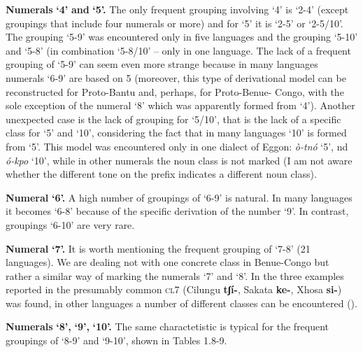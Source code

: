 \textbf{Numerals} \textbf{‘4’} \textbf{and} \textbf{‘5’.} The only frequent grouping involving ‘4’ is ‘2-4’ (except groupings that include four numerals or more) and for ‘5’ it is ‘2-5’ or ‘2-5/10’. The grouping ‘5-9’ was encountered only in five languages and the grouping ‘5-10’ and ‘5-8’ (in combination ‘5-8/10’ – only in one language. The lack of a frequent grouping of ‘5-9’ can seem even more strange because in many languages numerals ‘6-9’ are based on 5 (moreover, this type of derivational model can be reconstructed for Proto-Bantu and, perhaps, for Proto-Benue- Congo, with the sole exception of the numeral ‘8’ which was apparently formed from ‘4’). Another unexpected case is the lack of grouping for ‘5/10’, that is the lack of a specific class for ‘5’ and ‘10’, considering the fact that in many languages ‘10’ is formed from ‘5’. This model was encountered only in one dialect of Eggon: \textit{{\`{o}}-tn{\'{o}}} ‘5’, nd \textit{{\'{o}}-kpo} ‘10’, while in other numerals the noun class is not marked (I am not aware whether the different tone on the prefix indicates a different noun class). 

\textbf{Numeral} \textbf{‘6’.} A high number of groupings of ‘6-9’ is natural. In many languages it becomes ‘6-8’ because of the specific derivation of the number ‘9’. In contrast, groupings ‘6-10’ are very rare. 

\textbf{Numeral} \textbf{‘7’.} It is worth mentioning the frequent grouping of ‘7-8’ (21 languages). We are dealing not with one concrete class in Benue-Congo but rather a similar way of marking the numerals ‘7’ and ‘8’. In the three examples reported in  the presumably common \textsc{cl}7 (Cilungu \textbf{tʃ{\'{i}}-}, Sakata \textbf{ke-}, Xhosa \textbf{si-}) was found, in other languages a number of different classes can be encountered (). 

\textbf{Numerals} \textbf{‘8’,} \textbf{‘9’,} \textbf{‘10’.} The same charactetistic is typical for the frequent groupings of ‘8-9’ and ‘9-10’, shown in Tables 1.8-9. 


